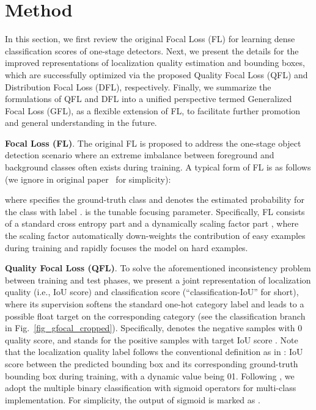 \documentclass{article}
\begin{document}
\section{Method}
\vspace{-4pt}
In this section, we first review the original Focal Loss \cite{lin2017focal} (FL) for learning dense classification scores of one-stage detectors. Next, we present the details for the improved representations of localization quality estimation and bounding boxes, which are successfully optimized via the proposed Quality Focal Loss (QFL) and Distribution Focal Loss (DFL), respectively. Finally, we summarize the formulations of QFL and DFL into a unified perspective termed Generalized Focal Loss (GFL), as a flexible extension of FL, to facilitate further promotion and general understanding in the future.

\textbf{Focal Loss (FL)}. The original FL \cite{lin2017focal} is proposed to address the one-stage object detection scenario where an extreme imbalance between foreground and background classes often exists during training. A typical form of FL is as follows (we ignore  in original paper~\cite{lin2017focal} for simplicity):

where  specifies the ground-truth class and  denotes the estimated probability for the class with label .  is the tunable focusing parameter. Specifically, 
FL consists of a standard cross entropy part  and a dynamically scaling factor part , where the scaling factor  automatically down-weights the contribution of easy examples during training and rapidly focuses the model on hard examples.


\textbf{Quality Focal Loss (QFL)}.
To solve the aforementioned inconsistency problem between training and test phases, we present a joint representation of localization quality (i.e., IoU score) and classification score (``classification-IoU'' for short), where its supervision softens the standard one-hot category label and leads to a possible float target 
on the corresponding category (see the classification branch in Fig.~\ref{fig_gfocal_cropped}). Specifically,  denotes the negative samples with 0 quality score, and  stands for the positive samples with target IoU score . Note that the localization quality label  follows the conventional definition as in \cite{wu2020iou,jiang2018acquisition}: IoU score between the predicted bounding box and its corresponding ground-truth bounding box during training, with a dynamic value being 01. Following \cite{lin2017focal,tian2019fcos}, we adopt the multiple binary classification with sigmoid operators  for multi-class implementation. For simplicity, the output of sigmoid is marked as . 
\end{document}
